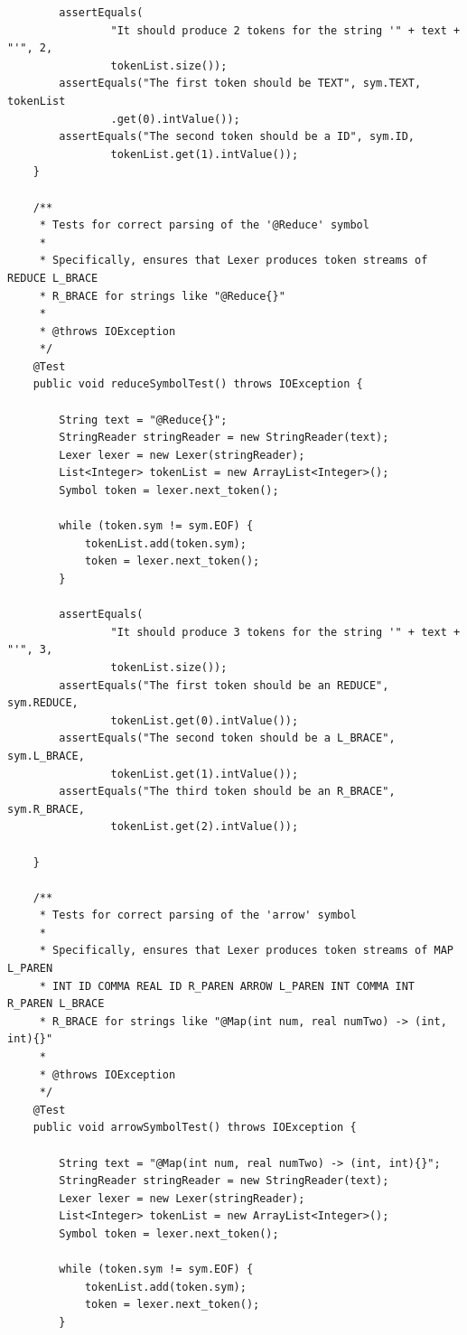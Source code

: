 \documentclass{report}
\begin{document}
\begin{verbatim}
		assertEquals(
				"It should produce 2 tokens for the string '" + text + "'", 2,
				tokenList.size());
		assertEquals("The first token should be TEXT", sym.TEXT, tokenList
				.get(0).intValue());
		assertEquals("The second token should be a ID", sym.ID,
				tokenList.get(1).intValue());
	}

	/**
	 * Tests for correct parsing of the '@Reduce' symbol
	 * 
	 * Specifically, ensures that Lexer produces token streams of REDUCE L_BRACE
	 * R_BRACE for strings like "@Reduce{}"
	 * 
	 * @throws IOException
	 */
	@Test
	public void reduceSymbolTest() throws IOException {

		String text = "@Reduce{}";
		StringReader stringReader = new StringReader(text);
		Lexer lexer = new Lexer(stringReader);
		List<Integer> tokenList = new ArrayList<Integer>();
		Symbol token = lexer.next_token();

		while (token.sym != sym.EOF) {
			tokenList.add(token.sym);
			token = lexer.next_token();
		}

		assertEquals(
				"It should produce 3 tokens for the string '" + text + "'", 3,
				tokenList.size());
		assertEquals("The first token should be an REDUCE", sym.REDUCE,
				tokenList.get(0).intValue());
		assertEquals("The second token should be a L_BRACE", sym.L_BRACE,
				tokenList.get(1).intValue());
		assertEquals("The third token should be an R_BRACE", sym.R_BRACE,
				tokenList.get(2).intValue());

	}

	/**
	 * Tests for correct parsing of the 'arrow' symbol
	 * 
	 * Specifically, ensures that Lexer produces token streams of MAP L_PAREN
	 * INT ID COMMA REAL ID R_PAREN ARROW L_PAREN INT COMMA INT R_PAREN L_BRACE
	 * R_BRACE for strings like "@Map(int num, real numTwo) -> (int, int){}"
	 * 
	 * @throws IOException
	 */
	@Test
	public void arrowSymbolTest() throws IOException {

		String text = "@Map(int num, real numTwo) -> (int, int){}";
		StringReader stringReader = new StringReader(text);
		Lexer lexer = new Lexer(stringReader);
		List<Integer> tokenList = new ArrayList<Integer>();
		Symbol token = lexer.next_token();

		while (token.sym != sym.EOF) {
			tokenList.add(token.sym);
			token = lexer.next_token();
		}


\end{verbatim}
\end{document}
